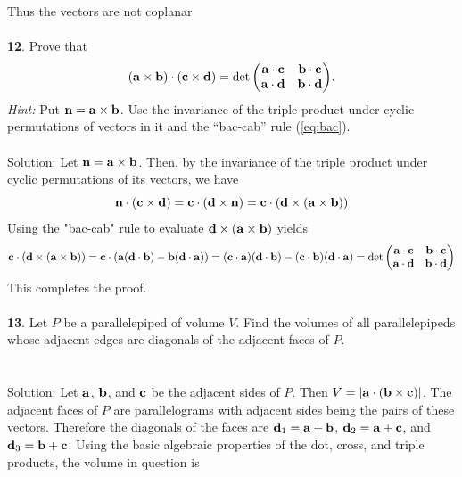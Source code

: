 \documentclass[12pt]{amsbook}
\begin{document}
Thus the vectors are not coplanar \\
\\
{\small\bf 12}. Prove that 
$$ 
({\bf a}\times{\bf b})\cdot ({\bf
c}\times{\bf d})= \det{\setlength\arraycolsep{.5em}
\begin{pmatrix} {\bf a}\cdot{\bf c} & {\bf
b}\cdot{\bf c}\\ {\bf a}\cdot{\bf d}& {\bf b}\cdot{\bf
d}\end{pmatrix}}. 
$$ 
{\it Hint:} Put ${\bf n}={\bf a}\times{\bf b}$. Use the invariance of the triple
product under cyclic permutations of vectors in it and 
the ``bac-cab'' rule (\ref{eq:bac}).\\
\\
{\sc Solution}: Let ${\bf n}={\bf a}\times{\bf b}$. Then, by the invariance of the triple product under cyclic permutations of its vectors, we have 
$${\bf n}\cdot({\bf c}\times{\bf d})={\bf c}\cdot({\bf d}\times{\bf n})={\bf c}\cdot({\bf d}\times({\bf a}\times{\bf b}))$$
Using the "bac-cab" rule to evaluate ${\bf d}\times({\bf a}\times{\bf b})$ yields
$${\bf c}\cdot({\bf d}\times({\bf a}\times{\bf b}))={\bf c}\cdot({\bf a}({\bf d}\cdot {\bf b})-{\bf b}({\bf d}\cdot {\bf a}))=({\bf c}\cdot{\bf a})({\bf d}\cdot {\bf b})-({\bf c}\cdot{\bf b})({\bf d}\cdot {\bf a})=\det{\setlength\arraycolsep{.5em}
\begin{pmatrix} {\bf a}\cdot{\bf c} & {\bf
b}\cdot{\bf c}\\ {\bf a}\cdot{\bf d}& {\bf b}\cdot{\bf
d}\end{pmatrix}}$$
This completes the proof.
\\
\\
{\small\bf 13}. Let $P$ be a parallelepiped of volume $V$. Find
the volumes of all parallelepipeds whose adjacent edges
are diagonals of the adjacent faces of $P$. \\
\\
\\
{\sc Solution}: Let ${\bf a}$, ${\bf b}$, and ${\bf c}$ be the adjacent 
sides of $P$. Then $V=|{\bf a}\cdot({\bf b}\times{\bf c})|$.
The adjacent faces of $P$ are parallelograms with 
adjacent sides being the pairs of these vectors. Therefore the 
diagonals of the faces are ${\bf d}_1={\bf a}+{\bf b}$,
${\bf d}_2={\bf a}+{\bf c}$, and ${\bf d}_3={\bf b}+{\bf c}$.
Using the basic algebraic properties of the dot, cross, and 
triple products, the volume in question is 
\end{document}
